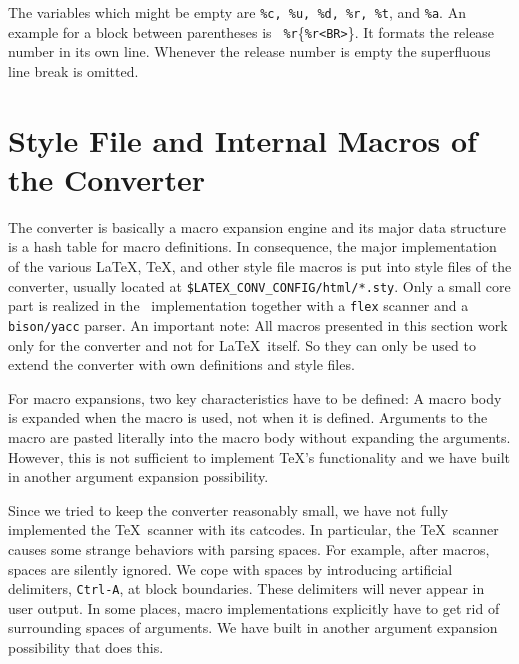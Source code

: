 \documentclass[11pt]{article}
\makeatletter
\newcommand{\TTindex}[1]{\index{#1@{\tt #1}}}
\newcommand{\Dindex}[1]{#1\index{#1}}
\makeatother
\begin{document}
The variables which might be empty are {\tt\%c, \%u, \%d, \%r, \%t},
and {\tt\%a}.  An example for a block between parentheses is {\tt
  \%r}\{{\tt \%r<BR>}\}. It formats the release number in its own line.
Whenever the release number is empty the superfluous line break
is omitted.

\section{Style File and Internal Macros of the Converter}

The converter is basically a macro expansion engine and its major data
structure is a hash table for macro definitions. In consequence, the
major implementation of the various \LaTeX, \TeX, and other style file
macros is put into style files of the converter, usually located at
{\tt \$\Open LATEX\_CONV\_CONFIG\Close/html/*.sty}. Only a small core
part is realized in the \CC\ implementation together with a {\tt flex}
scanner and a {\tt bison/yacc} parser. An important note: All macros
presented in this section work only for the converter and not for
\LaTeX\ itself. So they can only be used to extend the converter with own
definitions and style files.
\TTindex{flex}\TTindex{bison}\TTindex{yacc}

For macro expansions, two key characteristics have to be defined: A
macro body is expanded when the macro is used, not when it is defined.
Arguments to the macro are pasted literally into the macro body
without expanding the arguments. However, this is not sufficient to
implement \TeX's functionality and we have built in another argument
expansion possibility.

Since we tried to keep the converter reasonably small, we have not
fully implemented the \TeX\ scanner with its catcodes.
In particular, the \TeX\ scanner causes some strange behaviors with
\Dindex{parsing} spaces.
For example, after macros, spaces are silently ignored. We cope with
spaces by introducing artificial delimiters, {\tt Ctrl-A}, at block
boundaries. These delimiters will never appear in user output. In some
places, macro implementations explicitly have to get rid of
surrounding spaces of arguments. We have built in another argument
expansion possibility that does this.
\end{document}
